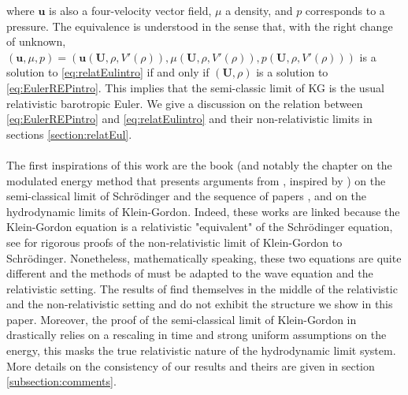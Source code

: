 \documentclass[a4paper, 15pt]{article}
\numberwithin{equation}{section}
\begin{document}
where $\textbf{u}$ is also a four-velocity vector field, $\mu$ a density, and $p$ corresponds to a pressure. The equivalence is understood
in the sense that, with the right change of unknown, $(\textbf{u},\mu,p)=(\textbf{u}(\textbf{U},\rho,V'(\rho)),\mu(\textbf{U},\rho,V'(\rho)),p(\textbf{U},\rho,V'(\rho)))$ is a solution to \eqref{eq:relatEulintro}
if and only if $(\textbf{U},\rho)$  is a solution to \eqref{eq:EulerREPintro}. This implies that the semi-classic limit of KG is the usual relativistic barotropic Euler. We give a discussion on the relation between \eqref{eq:EulerREPintro} and \eqref{eq:relatEulintro} and their non-relativistic limits in sections \ref{section:relatEul}.\\\\
The first inspirations of this work are the book \cite{zbMATH05243173} (and notably the chapter on the modulated energy method that presents arguments from \cite{zbMATH05503664}, inspired by \cite{zbMATH05000052}) on the semi-classical limit of Schrödinger and the sequence of papers \cite{zbMATH05782734}, \cite{zbMATH06101438} and \cite{zbMATH06039446} on the hydrodynamic limits of Klein-Gordon. Indeed, these works are linked because the Klein-Gordon equation is a relativistic "equivalent" of the Schrödinger equation, see \cite{zbMATH01837395,zbMATH01747314,zbMATH03871951,NAJMAN1990217,zbMATH06303453,zbMATH01650142,pasquali2018dynamicsnonlinearkleingordonequation,lei2023nonrelativistic,bambusi2025nonrelativisticlimitnonlinear}
for rigorous proofs of the non-relativistic limit of Klein-Gordon to Schrödinger. Nonetheless, mathematically speaking, these two equations are quite different and the methods of \cite{zbMATH05243173} must be adapted to the wave equation and the relativistic setting. The results of \cite{zbMATH06101438} find themselves in the middle of the relativistic and the non-relativistic setting and do not exhibit the structure we show in this paper. Moreover, the proof of the semi-classical limit of Klein-Gordon in \cite{zbMATH06101438} drastically relies on a rescaling in time and strong uniform assumptions on the energy, this masks the true relativistic nature of the hydrodynamic limit system. More details on the consistency of our results and theirs are given in section \ref{subsection:comments}. 
\\\\
\end{document}
